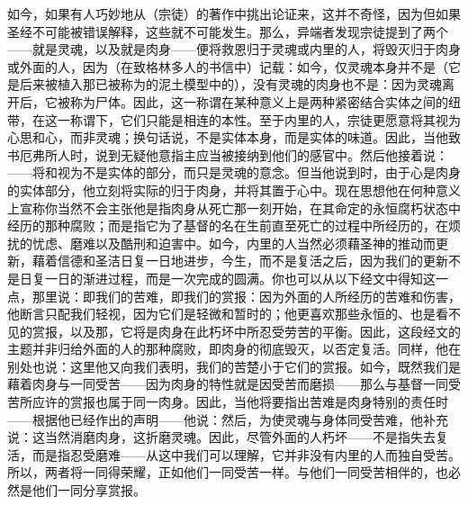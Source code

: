 如今，如果有人巧妙地从（宗徒）的著作中挑出论证来，这并不奇怪，因为但如果圣经不可能被错误解释，这些就不可能发生。那么，异端者发现宗徒提到了两个——就是灵魂，以及就是肉身——便将救恩归于灵魂或内里的人，将毁灭归于肉身或外面的人，因为（在致格林多人的书信中）记载：如今，仅灵魂本身并不是（它是后来被植入那已被称为的泥土模型中的），没有灵魂的肉身也不是：因为灵魂离开后，它被称为尸体。因此，这一称谓在某种意义上是两种紧密结合实体之间的纽带，在这一称谓下，它们只能是相连的本性。至于内里的人，宗徒更愿意将其视为心思和心，而非灵魂；换句话说，不是实体本身，而是实体的味道。因此，当他致书厄弗所人时，说到无疑他意指主应当被接纳到他们的感官中。然后他接着说：——将和视为不是实体的部分，而只是灵魂的意念。但当他说到时，由于心是肉身的实体部分，他立刻将实际的归于肉身，并将其置于心中。现在思想他在何种意义上宣称你当然不会主张他是指肉身从死亡那一刻开始，在其命定的永恒腐朽状态中经历的那种腐败；而是指它为了基督的名在生前直至死亡的过程中所经历的，在烦扰的忧虑、磨难以及酷刑和迫害中。如今，内里的人当然必须藉圣神的推动而更新，藉着信德和圣洁日复一日地进步，今生，而不是复活之后，因为我们的更新不是日复一日的渐进过程，而是一次完成的圆满。你也可以从以下经文中得知这一点，那里说：即我们的苦难，即我们的赏报：因为外面的人所经历的苦难和伤害，他断言只配我们轻视，因为它们是轻微和暂时的；他更喜欢那些永恒的、也是看不见的赏报，以及那，它将是肉身在此朽坏中所忍受劳苦的平衡。因此，这段经文的主题并非归给外面的人的那种腐败，即肉身的彻底毁灭，以否定复活。同样，他在别处也说：这里他又向我们表明，我们的苦楚小于它们的赏报。如今，既然我们是藉着肉身与一同受苦——因为肉身的特性就是因受苦而磨损——那么与基督一同受苦所应许的赏报也属于同一肉身。因此，当他将要指出苦难是肉身特别的责任时——根据他已经作出的声明——他说：然后，为使灵魂与身体同受苦难，他补充说：这当然消磨肉身，这折磨灵魂。因此，尽管外面的人朽坏——不是指失去复活，而是指忍受磨难——从这中我们可以理解，它并非没有内里的人而独自受苦。所以，两者将一同得荣耀，正如他们一同受苦一样。与他们一同受苦相伴的，也必然是他们一同分享赏报。\par

